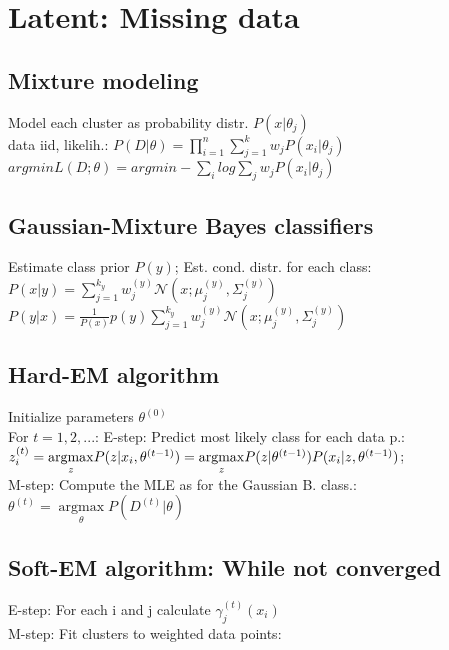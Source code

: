 \section*{Latent: Missing data}
\subsection*{Mixture modeling}

Model each cluster as probability distr. $P(x|\theta_j)$\\
data iid, likelih.: $P(D|\theta) = \prod_{i=1}^n \sum_{j=1}^k w_j P(x_i|\theta_j)$\\
$\underset{}{argmin}L(D;\theta) = \underset{}{argmin} - \sum_i log \sum_j w_j P(x_i| \theta_j)$

\subsection*{Gaussian-Mixture Bayes classifiers}
Estimate class prior $P(y)$; Est. cond. distr. for each class:
$P(x|y) = \sum_{j=1}^{k_y} w_j^{(y)} \mathcal{N}(x; \mu_j^{(y)}, \Sigma_j^{(y)})$\\
$P(y|x) = \frac{1}{P(x)} p(y) \sum_{j=1}^{k_y} w_j^{(y)} \mathcal{N}(x; \mu_j^{(y)}, \Sigma_j^{(y)})$

\subsection*{Hard-EM algorithm}
Initialize parameters $\theta^{(0)}$\\
For $t=1,2,...$:
E-step: Predict most likely class for each data p.:
$z_i^{(t)} = \underset{z}{\operatorname{argmax}} P(z|x_i, \theta^{(t-1)})\\
= \underset{z}{\operatorname{argmax}} P(z|\theta^{(t-1)}) P(x_i|z,\theta^{(t-1)})$;\\
M-step: Compute the MLE as for the Gaussian B. class.: $\theta^{(t)} = \underset{\theta}{\operatorname{argmax}} P(D^{(t)}|\theta)$

\subsection*{Soft-EM algorithm: While not converged}
E-step: For each i and j calculate $\gamma_j^{(t)}(x_i)$\\
M-step: Fit clusters to weighted data points:\\

